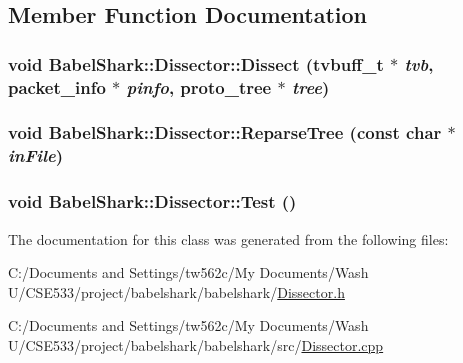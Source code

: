 \subsection{Member Function Documentation}
\hypertarget{class_babel_shark_1_1_dissector_b0bc01fa1d8c676b0879c95397744156}{
\subsubsection[{Dissect}]{\setlength{\rightskip}{0pt plus 5cm}void BabelShark::Dissector::Dissect (tvbuff\_\-t $\ast$ {\em tvb}, \/  packet\_\-info $\ast$ {\em pinfo}, \/  proto\_\-tree $\ast$ {\em tree})}}
\label{class_babel_shark_1_1_dissector_b0bc01fa1d8c676b0879c95397744156}


\hypertarget{class_babel_shark_1_1_dissector_bd6aaeb31ab6735c47075d2880c41e95}{
\subsubsection[{ReparseTree}]{\setlength{\rightskip}{0pt plus 5cm}void BabelShark::Dissector::ReparseTree (const char $\ast$ {\em inFile})}}
\label{class_babel_shark_1_1_dissector_bd6aaeb31ab6735c47075d2880c41e95}


\hypertarget{class_babel_shark_1_1_dissector_64ceaa81e2445c9ec2b22414cbfaeefa}{
\subsubsection[{Test}]{\setlength{\rightskip}{0pt plus 5cm}void BabelShark::Dissector::Test ()}}
\label{class_babel_shark_1_1_dissector_64ceaa81e2445c9ec2b22414cbfaeefa}




The documentation for this class was generated from the following files:\begin{CompactItemize}
\item 
C:/Documents and Settings/tw562c/My Documents/Wash U/CSE533/project/babelshark/babelshark/\hyperlink{_dissector_8h}{Dissector.h}\item 
C:/Documents and Settings/tw562c/My Documents/Wash U/CSE533/project/babelshark/babelshark/src/\hyperlink{_dissector_8cpp}{Dissector.cpp}\end{CompactItemize}
